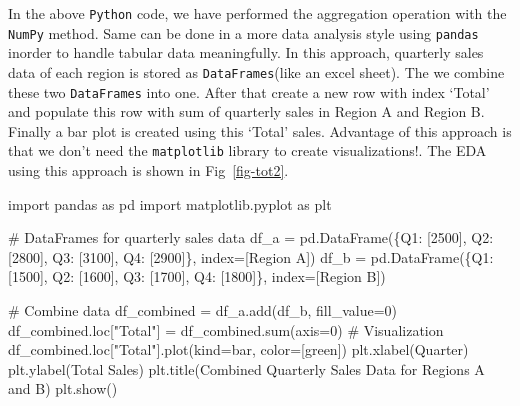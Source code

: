 \documentclass[
  letterpaper,
  DIV=11,
  numbers=noendperiod]{scrreprt}
\newenvironment{Shaded}{\begin{snugshade}}{\end{snugshade}}
\newcommand{\BuiltInTok}[1]{\textcolor[rgb]{0.00,0.23,0.31}{#1}}
\newcommand{\CommentTok}[1]{\textcolor[rgb]{0.37,0.37,0.37}{#1}}
\newcommand{\DecValTok}[1]{\textcolor[rgb]{0.68,0.00,0.00}{#1}}
\newcommand{\ImportTok}[1]{\textcolor[rgb]{0.00,0.46,0.62}{#1}}
\newcommand{\NormalTok}[1]{\textcolor[rgb]{0.00,0.23,0.31}{#1}}
\newcommand{\OperatorTok}[1]{\textcolor[rgb]{0.37,0.37,0.37}{#1}}
\newcommand{\StringTok}[1]{\textcolor[rgb]{0.13,0.47,0.30}{#1}}
\theoremstyle{plain}
\theoremstyle{definition}
\theoremstyle{remark}
\begin{document}
In the above \texttt{Python} code, we have performed the aggregation
operation with the \texttt{NumPy} method. Same can be done in a more
data analysis style using \texttt{pandas} inorder to handle tabular data
meaningfully. In this approach, quarterly sales data of each region is
stored as \texttt{DataFrames}(like an excel sheet). The we combine these
two \texttt{DataFrames} into one. After that create a new row with index
`Total' and populate this row with sum of quarterly sales in Region A
and Region B. Finally a bar plot is created using this `Total' sales.
Advantage of this approach is that we don't need the \texttt{matplotlib}
library to create visualizations!. The EDA using this approach is shown
in Fig~\ref{fig-tot2}.

\begin{Shaded}
\begin{Highlighting}[]
\ImportTok{import}\NormalTok{ pandas }\ImportTok{as}\NormalTok{ pd}
\ImportTok{import}\NormalTok{ matplotlib.pyplot }\ImportTok{as}\NormalTok{ plt}

\CommentTok{\# DataFrames for quarterly sales data}
\NormalTok{df\_a }\OperatorTok{=}\NormalTok{ pd.DataFrame(\{}\StringTok{\textquotesingle{}Q1\textquotesingle{}}\NormalTok{: [}\DecValTok{2500}\NormalTok{], }\StringTok{\textquotesingle{}Q2\textquotesingle{}}\NormalTok{: [}\DecValTok{2800}\NormalTok{], }\StringTok{\textquotesingle{}Q3\textquotesingle{}}\NormalTok{: [}\DecValTok{3100}\NormalTok{], }\StringTok{\textquotesingle{}Q4\textquotesingle{}}\NormalTok{: [}\DecValTok{2900}\NormalTok{]\}, index}\OperatorTok{=}\NormalTok{[}\StringTok{\textquotesingle{}Region A\textquotesingle{}}\NormalTok{])}
\NormalTok{df\_b }\OperatorTok{=}\NormalTok{ pd.DataFrame(\{}\StringTok{\textquotesingle{}Q1\textquotesingle{}}\NormalTok{: [}\DecValTok{1500}\NormalTok{], }\StringTok{\textquotesingle{}Q2\textquotesingle{}}\NormalTok{: [}\DecValTok{1600}\NormalTok{], }\StringTok{\textquotesingle{}Q3\textquotesingle{}}\NormalTok{: [}\DecValTok{1700}\NormalTok{], }\StringTok{\textquotesingle{}Q4\textquotesingle{}}\NormalTok{: [}\DecValTok{1800}\NormalTok{]\}, index}\OperatorTok{=}\NormalTok{[}\StringTok{\textquotesingle{}Region B\textquotesingle{}}\NormalTok{])}

\CommentTok{\# Combine data}
\NormalTok{df\_combined }\OperatorTok{=}\NormalTok{ df\_a.add(df\_b, fill\_value}\OperatorTok{=}\DecValTok{0}\NormalTok{)}
\NormalTok{df\_combined.loc[}\StringTok{"Total"}\NormalTok{] }\OperatorTok{=}\NormalTok{ df\_combined.}\BuiltInTok{sum}\NormalTok{(axis}\OperatorTok{=}\DecValTok{0}\NormalTok{)}
\CommentTok{\# Visualization}
\NormalTok{df\_combined.loc[}\StringTok{"Total"}\NormalTok{].plot(kind}\OperatorTok{=}\StringTok{\textquotesingle{}bar\textquotesingle{}}\NormalTok{, color}\OperatorTok{=}\NormalTok{[}\StringTok{\textquotesingle{}green\textquotesingle{}}\NormalTok{])}
\NormalTok{plt.xlabel(}\StringTok{\textquotesingle{}Quarter\textquotesingle{}}\NormalTok{)}
\NormalTok{plt.ylabel(}\StringTok{\textquotesingle{}Total Sales\textquotesingle{}}\NormalTok{)}
\NormalTok{plt.title(}\StringTok{\textquotesingle{}Combined Quarterly Sales Data for Regions A and B\textquotesingle{}}\NormalTok{)}
\NormalTok{plt.show()}
\end{Highlighting}
\end{Shaded}
\end{document}
